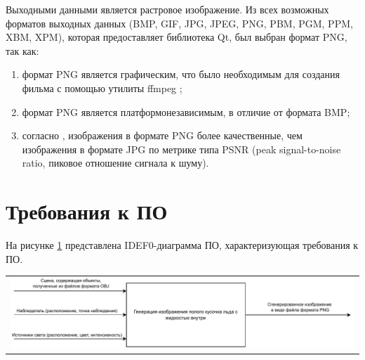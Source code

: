 Выходными данными является растровое изображение. Из всех возможных форматов выходных данных (BMP, GIF, JPG, JPEG, PNG, PBM, PGM, PPM, XBM, XPM), которая предоставляет библиотека Qt, был выбран формат PNG, так как:
\begin{enumerate}[label=\arabic*)]
	\item формат PNG является графическим, что было необходимым для создания фильма с помощью утилиты ffmpeg \cite{ffmpeg};
	\item формат PNG является платформонезависимым, в отличие от формата BMP;
	\item согласно \cite{jpgvspng}, изображения в формате PNG более качественные, чем изображения в формате JPG по метрике типа PSNR (peak signal-to-noise ratio, пиковое отношение сигнала к шуму).
\end{enumerate}

\clearpage
\section{Требования к ПО}

На рисунке \ref{img:idef} представлена IDEF0-диаграмма ПО, характеризующая требования к ПО.
\begin{table}[H]
	\centering
	\begin{tabular}{p{1\linewidth}}
		\centering
		\includegraphics[width=1.0\linewidth]{include/idef0.pdf}
		\captionof{figure}{IDEF0-диаграмма ПО}
		\label{img:idef}
	\end{tabular}
\end{table}

